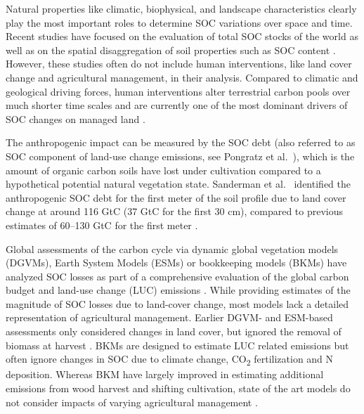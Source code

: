 \documentclass[gc, manuscript]{copernicus}
\begin{document}
Natural properties like climatic, biophysical, and landscape characteristics clearly play the most important roles to determine SOC variations over space and time. Recent studies have focused on the evaluation of total SOC stocks of the world as well as on the spatial disaggregation of soil properties such as SOC content \citep{batjes_harmonized_2016, hengl_soilgrids250m_2017, fao_global_2018}. However, these studies often do not include human interventions, like land cover change and agricultural management, in their analysis. Compared to climatic and geological driving forces, human interventions alter terrestrial carbon pools over much shorter time scales and are currently one of the most dominant drivers of SOC changes on managed land \citep{hansis_relevance_2015, bastos_comparison_2021}.

The anthropogenic impact can be measured by the SOC debt (also referred to as SOC component of land-use change emissions, see Pongratz et al.~\citeyearpar{pongratz_terminolgy_2014}), which is the amount of organic carbon soils have lost under cultivation compared to a hypothetical potential natural vegetation state. Sanderman et al.~\citeyearpar{sanderman_soil_2017} identified the anthropogenic SOC debt for the first meter of the soil profile due to land cover change at around 116 GtC (37 GtC for the first 30 cm), compared to previous estimates of 60--130 GtC for the first meter \citep{lal_world_2001}.

Global assessments of the carbon cycle via dynamic global vegetation models (DGVMs), Earth System Models (ESMs) or bookkeeping models (BKMs) have analyzed SOC losses as part of a comprehensive evaluation of the global carbon budget and land-use change (LUC) emissions \citep{frielingstein_glob_carbon_2020}. While providing estimates of the magnitude of SOC losses due to land-cover change, most models lack a detailed representation of agricultural management. Earlier DGVM- and ESM-based assessments only considered changes in land cover, but ignored the removal of biomass at harvest \citep{strassmann_simulating_2008, betts_climate_2015}. BKMs are designed to estimate LUC related emissions but often ignore changes in SOC due to climate change, CO\textsubscript{2} fertilization and N deposition. Whereas BKM have largely improved in estimating additional emissions from wood harvest and shifting cultivation, state of the art models do not consider impacts of varying agricultural management \citep{frielingstein_glob_carbon_2020, houghton_carbon_2012, hansis_relevance_2015, bastos_comparison_2021}.
\end{document}
